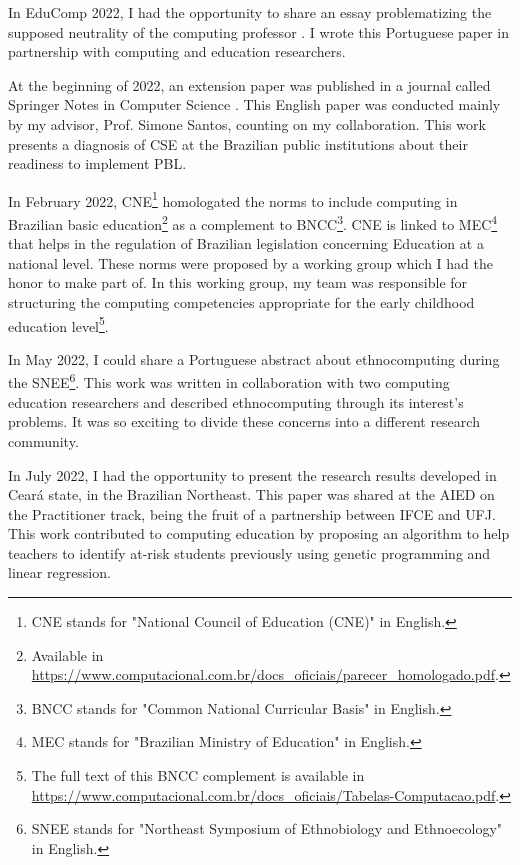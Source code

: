 In \gls{EduComp} 2022, I had the opportunity to share an essay problematizing the supposed neutrality of the computing professor \cite{bispojr:2022-educomp}. I wrote this Portuguese paper in partnership with computing and education researchers.

At the beginning of 2022, an extension paper was published in a journal called Springer Notes in Computer Science \cite{santos:2022}. This English paper was conducted mainly by my advisor, Prof. Simone Santos, counting on my collaboration. This work presents a diagnosis of \gls{CSE} at the Brazilian public institutions about their readiness to implement \gls{PBL}.

In February 2022, \gls{CNE}\footnote{CNE stands for "National Council of Education (CNE)" in English.} homologated the norms to include computing in Brazilian basic education\footnote{Available in \url{https://www.computacional.com.br/docs_oficiais/parecer_homologado.pdf}.} as a complement to \gls{BNCC}\footnote{BNCC stands for "Common National Curricular Basis" in English.}. \gls{CNE} is linked to \gls{MEC}\footnote{MEC stands for "Brazilian Ministry of Education" in English.} that helps in the regulation of Brazilian legislation concerning Education at a national level. These norms were proposed by a working group which I had the honor to make part of. In this working group, my team was responsible for structuring the computing competencies appropriate for the early childhood education level\footnote{The full text of this \gls{BNCC} complement is available in \url{https://www.computacional.com.br/docs_oficiais/Tabelas-Computacao.pdf}.}.

In May 2022, I could share a Portuguese abstract about ethnocomputing \cite{bispojr:2022-snee} during the \gls{SNEE}\footnote{SNEE stands for "Northeast Symposium of Ethnobiology and Ethnoecology" in English.}. This work was written in collaboration with two computing education researchers and described ethnocomputing through its interest’s problems. It was so exciting to divide these concerns into a different research community.

In July 2022, I had the opportunity to present the research results developed in Ceará state, in the Brazilian Northeast. This paper \cite{esmeraldo:2022} was shared at the \gls{AIED} on the Practitioner track, being the fruit of a partnership between \gls{IFCE} and \gls{UFJ}. This work contributed to computing education by proposing an algorithm to help teachers to identify at-risk students previously using genetic programming and linear regression.

